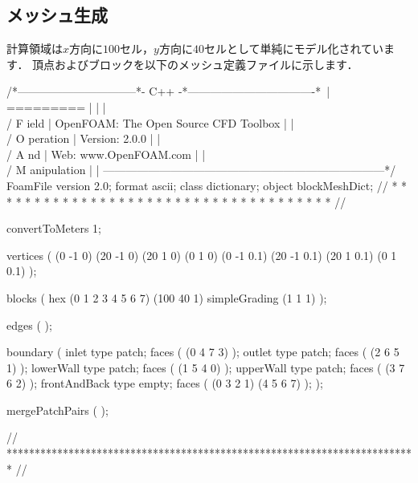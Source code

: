\subsection{メッシュ生成}
\label{ssec:3.5.2}
計算領域は$x$方向に$100$セル，$y$方向に$40$セルとして単純にモデル化されています．
頂点およびブロックを以下のメッシュ定義ファイルに示します．
\begin{OFverbatim}
/*--------------------------------*- C++ -*----------------------------------*\
| =========                 |                                                 |
| \\      /  F ield         | OpenFOAM: The Open Source CFD Toolbox           |
|  \\    /   O peration     | Version:  2.0.0                                 |
|   \\  /    A nd           | Web:      www.OpenFOAM.com                      |
|    \\/     M anipulation  |                                                 |
\*---------------------------------------------------------------------------*/
FoamFile
{
    version     2.0;
    format      ascii;
    class       dictionary;
    object      blockMeshDict;
}
// * * * * * * * * * * * * * * * * * * * * * * * * * * * * * * * * * * * * * //

convertToMeters 1;

vertices        
(
    (0 -1 0)
    (20 -1 0)
    (20 1 0)
    (0 1 0)
    (0 -1 0.1)
    (20 -1 0.1)
    (20 1 0.1)
    (0 1 0.1)
);

blocks          
(
    hex (0 1 2 3 4 5 6 7) (100 40 1) simpleGrading (1 1 1)
);

edges           
(
);

boundary
(
    inlet
    {
        type patch;
        faces
        (
            (0 4 7 3)
        );
    }
    outlet
    {
        type patch;
        faces
        (
            (2 6 5 1)
        );
    }
    lowerWall
    {
        type patch;
        faces
        (
            (1 5 4 0)
        );
    }
    upperWall
    {
        type patch;
        faces
        (
            (3 7 6 2)
        );
    }
    frontAndBack
    {
        type empty;
        faces
        (
            (0 3 2 1)
            (4 5 6 7)
        );
    }
);

mergePatchPairs
(
);

// ************************************************************************* //
\end{OFverbatim}


